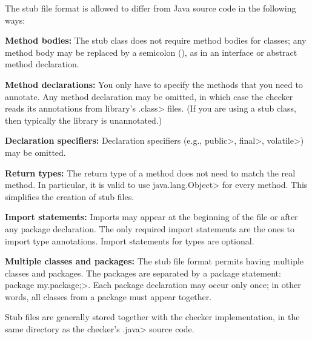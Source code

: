 The stub file format is allowed to differ from Java source code in the
following ways:
\begin{description}

\item{\textbf{Method bodies:}}
  The stub class does not require method bodies for classes; any method
  body may be replaced by a semicolon (\code{;}), as in an interface or
  abstract method declaration.

\item{\textbf{Method declarations:}}
  You only have to specify the methods that you need to annotate.
  Any method declaration may be omitted, in which case the checker reads
  its annotations from library's \<.class> files.  (If you are using a stub class, then
  typically the library is unannotated.)

\item{\textbf{Declaration specifiers:}}
  Declaration specifiers (e.g., \<public>, \<final>, \<volatile>)
  may be omitted.

\item{\textbf{Return types:}}
  The return type of a method does not need to match the real method.
  In particular, it is valid to use \<java.lang.Object> for every method.
  This simplifies the creation of stub files.

\item{\textbf{Import statements:}}
  Imports may appear at the beginning of the file or after any package declaration.
  The only required import statements are the ones to import type
  annotations.  Import statements for types are optional.

\item{\textbf{Multiple classes and packages:}}
  The stub file format permits having multiple classes and packages.
  The packages are separated by a package statement:
  \<package my.package;>.  Each package declaration may occur only once; in
  other words, all classes from a package must appear together.

\end{description}




Stub files are generally stored together with the checker implementation,
in the same directory as the checker's \<.java> source code.



